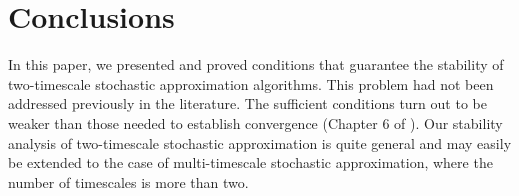 \section{Conclusions}\label{disc}

In this paper, we presented and proved conditions that guarantee the stability of two-timescale 
stochastic approximation algorithms. This problem had not been addressed previously in the
literature. The sufficient conditions turn out to be weaker than those needed
to establish convergence (Chapter 6 of \cite{SA}).
Our stability analysis of two-timescale stochastic approximation is quite general and
may easily be extended
to the case of multi-timescale stochastic approximation, where the number of timescales
is more than two. 
